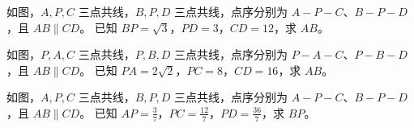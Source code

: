\documentclass{exam-zh}
\begin{document}

\begin{problem}[points=10]
  \noindent
  \begin{minipage}[t]{\dimexpr\linewidth-60mm-6mm\relax}
    \vspace{0pt}
    如图，$A,P,C$ 三点共线，$B,P,D$ 三点共线，点序分别为 $A-P-C$、$B-P-D$，且 $AB\parallel CD$。
已知 $BP=\sqrt{3}$，$PD=3$，$CD=12$，求 $AB$。
    
  \end{minipage}\hfill
  \begin{diagramcoltikz}{60mm}{先看平行边方向，再判断 A 字型或 8 字型及对应边。}
  }
  \end{diagramcoltikz}
  \par\medskip
  \answerarea[42mm]
\end{problem}



\begin{problem}[points=10]
  \noindent
  \begin{minipage}[t]{\dimexpr\linewidth-60mm-6mm\relax}
    \vspace{0pt}
    如图，$P,A,C$ 三点共线，$P,B,D$ 三点共线，点序分别为 $P-A-C$、$P-B-D$，且 $AB\parallel CD$。
已知 $PA=2\sqrt{2}$，$PC=8$，$CD=16$，求 $AB$。
    
  \end{minipage}\hfill
  \begin{diagramcoltikz}{60mm}{先看平行边方向，再判断 A 字型或 8 字型及对应边。}
  }
  \end{diagramcoltikz}
  \par\medskip
  \answerarea[42mm]
\end{problem}



\begin{problem}[points=10]
  \noindent
  \begin{minipage}[t]{\dimexpr\linewidth-60mm-6mm\relax}
    \vspace{0pt}
    如图，$A,P,C$ 三点共线，$B,P,D$ 三点共线，点序分别为 $A-P-C$、$B-P-D$，且 $AB\parallel CD$。
已知 $AP=\frac{3}{7}$，$PC=\frac{12}{7}$，$PD=\frac{36}{7}$，求 $BP$。
    
  \end{minipage}\hfill
  \begin{diagramcoltikz}{60mm}{先看平行边方向，再判断 A 字型或 8 字型及对应边。}
  }
  \end{diagramcoltikz}
  \par\medskip
  \answerarea[42mm]
\end{problem}
\end{document}
